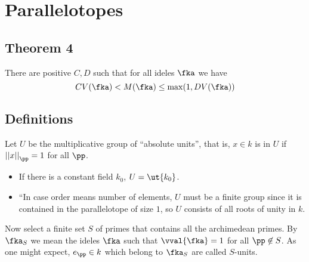 \documentclass{article}
\begin{document}
\section{Parallelotopes}
\label{sec:orgheadline31}
\subsection{Theorem 4}
\label{sec:orgheadline29}
There are positive \(C, D\) such that for all ideles \(\fka\) we have
\[ CV(\fka) < M(\fka) \leq \max(1, DV(\fka)) \]

\subsection{Definitions}
\label{sec:orgheadline30}
Let \(U\) be the multiplicative group of ``absolute units'', that is, \(x\in k\) is in \(U\) if \({||x||}_\pp = 1\) for all \(\pp\).
\begin{itemize}
\item If there is a constant field \(k_0\), \(U=\ut {k_0}\).
\item ``In case order means number of elements, \(U\) must be a finite group since it is contained in the parallelotope of size \(1\), so \(U\) consists of all roots of unity in \(k\).
\end{itemize}
Now select a finite set \(S\) of primes that contains all the archimedean primes. By \(\fka_S\) we mean the ideles \(\fka\) such that \(\vval{ \fka } = 1\) for all \(\pp\not\in S\). As one might expect, \(e_\pp\in k\) which belong to \(\fka_S\) are called \(S\)-units.
\end{document}
